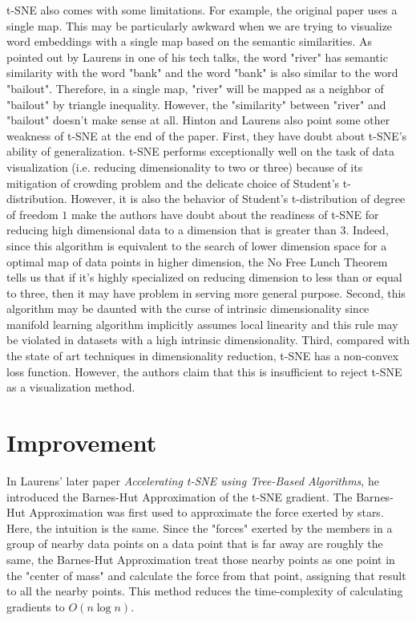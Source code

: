\documentclass[letter,10pt]{article}
\begin{document}
t-SNE also comes with some limitations. For example, the original paper uses a single map. This may be particularly awkward when we are trying to visualize word embeddings with a single map based on the semantic similarities. As pointed out by Laurens in one of his tech talks\cite{Maaten13:online}, the word "river" has semantic similarity with the word "bank" and the word "bank" is also similar to the word "bailout". Therefore, in a single map, "river" will be mapped as a neighbor of "bailout" by triangle inequality. However, the "similarity" between "river" and "bailout" doesn't make sense at all. Hinton and Laurens also point some other weakness of t-SNE at the end of the paper. First, they have doubt about t-SNE's ability of generalization. t-SNE performs exceptionally well on the task of data visualization (i.e. reducing dimensionality to two or three) because of its mitigation of crowding problem and the delicate choice of Student's t-distribution. However, it is also the behavior of Student's t-distribution of degree of freedom $1$ make the authors have doubt about the readiness of t-SNE for reducing high dimensional data to a dimension that is greater than $3$. Indeed, since this algorithm is equivalent to the search of lower dimension space for a optimal map of data points in higher dimension, the No Free Lunch Theorem tells us that if it's highly specialized on reducing dimension to less than or equal to three, then it may have problem in serving more general purpose. Second, this algorithm may be daunted with the curse of intrinsic dimensionality since manifold learning algorithm implicitly assumes local linearity and this rule may be violated in datasets with a high intrinsic dimensionality. Third, compared with the state of art techniques in dimensionality reduction, t-SNE has a non-convex loss function. However, the authors claim that this is insufficient to reject t-SNE as a visualization method.

\section{Improvement}

In Laurens' later paper \textit{Accelerating t-SNE using Tree-Based Algorithms}\cite{journals/jmlr/Maaten14}, he introduced the Barnes-Hut Approximation of the t-SNE gradient. The Barnes-Hut Approximation was first used to approximate the force exerted by stars. Here, the intuition is the same. Since the "forces" exerted by the members in a group of nearby data points on a data point that is far away are roughly the same, the Barnes-Hut Approximation treat those nearby points as one point in the "center of mass" and calculate the force from that point, assigning that result to all the nearby points. This method reduces the time-complexity of calculating gradients to $O(n\log n)$.
\end{document}
